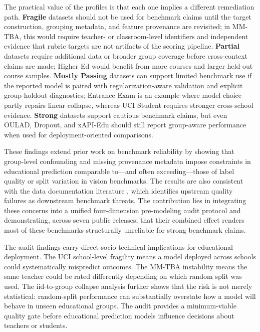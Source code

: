 \documentclass[10pt,letterpaper]{wlscirep}
\begin{document}
The practical value of the profiles is that each one implies a different remediation path. \textbf{Fragile} datasets should not be used for benchmark claims until the target construction, grouping metadata, and feature provenance are revisited; in MM-TBA, this would require teacher- or classroom-level identifiers and independent evidence that rubric targets are not artifacts of the scoring pipeline. \textbf{Partial} datasets require additional data or broader group coverage before cross-context claims are made; Higher Ed would benefit from more courses and larger held-out course samples. \textbf{Mostly Passing} datasets can support limited benchmark use if the reported model is paired with regularization-aware validation and explicit group-holdout diagnostics; Entrance Exam is an example where model choice partly repairs linear collapse, whereas UCI Student requires stronger cross-school evidence. \textbf{Strong} datasets support cautious benchmark claims, but even OULAD, Dropout, and xAPI-Edu should still report group-aware performance when used for deployment-oriented comparisons.

These findings extend prior work on benchmark reliability \citep{Northcutt2021,Recht2019,Bouthillier2021} by showing that group-level confounding and missing provenance metadata impose constraints in educational prediction comparable to—and often exceeding—those of label quality or split variation in vision benchmarks. The results are also consistent with the data documentation literature \citep{Gebru2021,Sambasivan2021}, which identifies upstream quality failures as downstream benchmark threats. The contribution lies in integrating these concerns into a unified four-dimension pre-modeling audit protocol and demonstrating, across seven public releases, that their combined effect renders most of these benchmarks structurally unreliable for strong benchmark claims.

The audit findings carry direct socio-technical implications for educational deployment. The UCI school-level fragility means a model deployed across schools could systematically mispredict outcomes. The MM-TBA instability means the same teacher could be rated differently depending on which random split was used. The iid-to-group collapse analysis further shows that the risk is not merely statistical: random-split performance can substantially overstate how a model will behave in unseen educational groups. The audit provides a minimum-viable quality gate before educational prediction models influence decisions about teachers or students.
\end{document}
